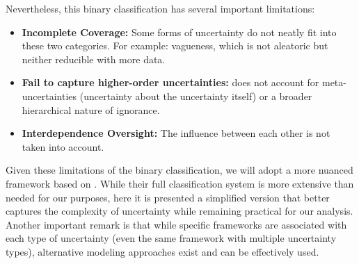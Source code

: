 Nevertheless, this binary classification has several important limitations:

\begin{itemize}
    \item \textbf{Incomplete Coverage:} Some forms of uncertainty do not neatly fit into these two categories. For example: vagueness, which is not aleatoric but neither reducible with more data.
    \item \textbf{Fail to capture higher-order uncertainties:} does not account for meta-uncertainties (uncertainty about the uncertainty itself) or a broader hierarchical nature of ignorance.
    \item \textbf{Interdependence Oversight:} The influence between each other is not taken into account.
\end{itemize}

Given these limitations of the binary classification, we will adopt a more nuanced framework based on \cite{UncertaintySciences}. While their full classification system is more extensive than needed for our purposes, here it is presented a simplified version that better captures the complexity of uncertainty while remaining practical for our analysis. Another important remark is that while specific frameworks are associated with each type of uncertainty (even the same framework with multiple uncertainty types), alternative modeling approaches exist and can be effectively used.


